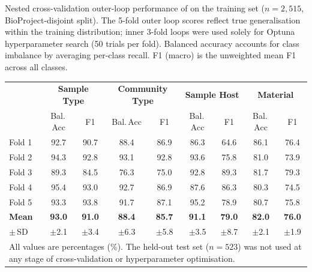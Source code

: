 \centering
\caption{Nested cross-validation outer-loop performance of \diana on the training set
($n=2{,}515$, BioProject-disjoint split).
The 5-fold outer loop scores reflect true generalisation within the training distribution;
inner 3-fold loops were used solely for Optuna hyperparameter search (50 trials per fold).
Balanced accuracy accounts for class imbalance by averaging per-class recall.
F1 (macro) is the unweighted mean F1 across all classes.
\label{tab:nested_cv}}
\begin{tabular}{lcccccccc}
\toprule
 & \multicolumn{2}{c}{\textbf{Sample Type}} & \multicolumn{2}{c}{\textbf{Community Type}} & \multicolumn{2}{c}{\textbf{Sample Host}} & \multicolumn{2}{c}{\textbf{Material}} \\
\cmidrule(lr){2-3}\cmidrule(lr){4-5}\cmidrule(lr){6-7}\cmidrule(lr){8-9}
 & Bal.\,Acc & F1 & Bal.\,Acc & F1 & Bal.\,Acc & F1 & Bal.\,Acc & F1 \\
\midrule
Fold 1 & 92.7 & 90.7 & 88.4 & 86.9 & 86.3 & 64.6 & 86.1 & 76.4 \\
Fold 2 & 94.3 & 92.8 & 93.1 & 92.8 & 93.6 & 75.8 & 81.0 & 73.9 \\
Fold 3 & 89.3 & 84.5 & 76.3 & 75.0 & 92.8 & 89.3 & 81.7 & 79.3 \\
Fold 4 & 95.4 & 93.0 & 92.7 & 86.9 & 87.6 & 86.3 & 80.3 & 74.5 \\
Fold 5 & 93.3 & 93.8 & 91.7 & 87.1 & 95.2 & 78.9 & 80.7 & 75.8 \\
\midrule
\textbf{Mean} & \textbf{93.0} & \textbf{91.0} & \textbf{88.4} & \textbf{85.7} & \textbf{91.1} & \textbf{79.0} & \textbf{82.0} & \textbf{76.0} \\
$\pm$\,SD      & $\pm$2.1 & $\pm$3.4 & $\pm$6.3 & $\pm$5.8 & $\pm$3.5 & $\pm$8.7 & $\pm$2.1 & $\pm$1.9 \\
\bottomrule
\multicolumn{9}{p{0.92\linewidth}}{\footnotesize All values are percentages (\%). The held-out test set ($n=523$) was not used at any stage of cross-validation or hyperparameter optimisation.}
\end{tabular}
